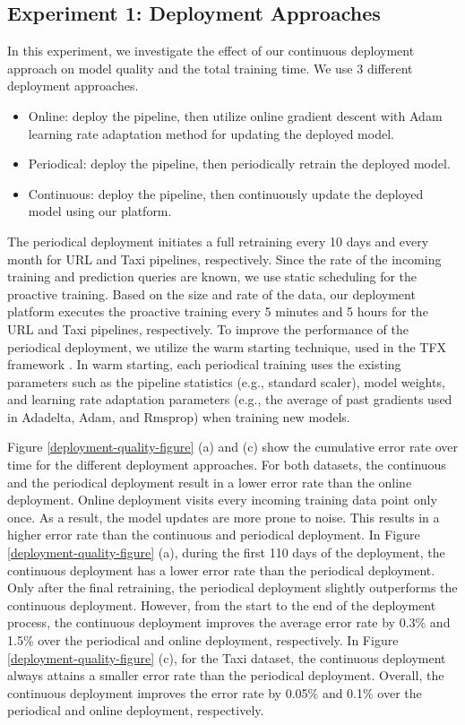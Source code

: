 \subsection{Experiment 1: Deployment Approaches}
In this experiment, we investigate the effect of our continuous deployment approach on model quality and the total training time.
We use 3 different deployment approaches.
\begin{itemize}
\item Online: deploy the pipeline, then utilize online gradient descent with Adam learning rate adaptation method for updating the deployed model.
\item Periodical: deploy the pipeline, then periodically retrain the deployed model.
\item Continuous: deploy the pipeline, then continuously update the deployed model using our platform.
\end{itemize}

The periodical deployment initiates a full retraining every 10 days and every month for URL and Taxi pipelines, respectively.
Since the rate of the incoming training and prediction queries are known, we use static scheduling for the proactive training.
Based on the size and rate of the data, our deployment platform executes the proactive training every 5 minutes and 5 hours for the URL and Taxi pipelines, respectively.
To improve the performance of the periodical deployment, we utilize the warm starting technique, used in the TFX framework \cite{baylor2017tfx}.
In warm starting, each periodical training uses the existing parameters such as the pipeline statistics (e.g., standard scaler), model weights, and learning rate adaptation parameters (e.g., the average of past gradients used in Adadelta, Adam, and Rmsprop) when training new models.

Figure \ref{deployment-quality-figure} (a) and (c) show the cumulative error rate over time for the different deployment approaches.
For both datasets, the continuous and the periodical deployment result in a lower error rate than the online deployment.
Online deployment visits every incoming training data point only once.
As a result, the model updates are more prone to noise.
This results in a higher error rate than the continuous and periodical deployment.
In Figure \ref{deployment-quality-figure} (a), during the first 110 days of the deployment, the continuous deployment has a lower error rate than the periodical deployment.
Only after the final retraining, the periodical deployment slightly outperforms the continuous deployment.
However, from the start to the end of the deployment process, the continuous deployment improves the average error rate by 0.3\% and 1.5\% over the periodical and online deployment, respectively.
In Figure \ref{deployment-quality-figure}  (c), for the Taxi dataset, the continuous deployment always attains a smaller error rate than the periodical deployment.
Overall, the continuous deployment improves the error rate by 0.05\% and  0.1\% over the periodical and online deployment, respectively.

